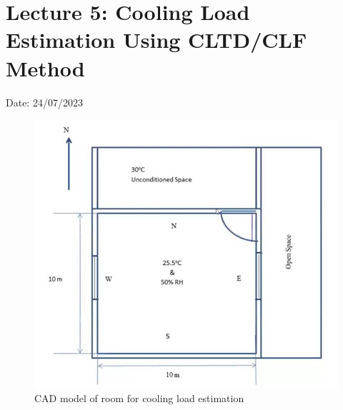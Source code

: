 \documentclass{article}
\begin{document}
\pagebreak

\section{Lecture 5: Cooling Load Estimation Using CLTD/CLF Method}
\hfill Date: 24/07/2023

\begin{figure}[H]
  \begin{center}
    \includegraphics[width=\columnwidth]{img/cooling_load.jpeg}
    \caption{CAD model of room for cooling load estimation}
  \end{center}
\end{figure}
\end{document}
